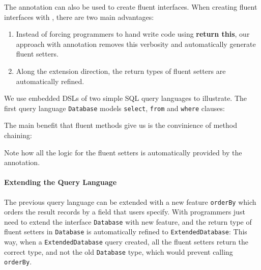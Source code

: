 The \mixin annotation can also be used to create fluent interfaces.  When
creating fluent interfaces with \mixin, there are two main advantages:
\begin{enumerate}
\item Instead of forcing programmers to hand write code using \textbf{return
    this}, our approach with \mixin annotation removes this verbosity and
  automatically generate fluent setters.
\item Along the extension direction, the return types of fluent setters are
  automatically refined.
\end{enumerate} 

\noindent We use embedded DSLs of two simple SQL query languages to illustrate.
The first query language \texttt{Database}  models
\texttt{select}, \texttt{from} and \texttt{where} clauses:

\noindent The main benefit that fluent methods give
us is the convinience of method chaining:


\noindent Note how all the logic for the fluent setters is automatically provided by the \mixin annotation. 

\paragraph{Extending the Query Language} The previous query language can be extended with a new feature
\texttt{orderBy} which orders the result records by a field that users
specify. With \mixin programmers just need to extend the interface \texttt{Database} with new
feature, and the return type of fluent setters in
\texttt{Database} is automatically refined to \texttt{ExtendedDatabase}:
This way, when a \texttt{ExtendedDatabase} query created, 
all the fluent setters return the correct type, and not the old \texttt{Database} type, which would prevent calling 
\texttt{orderBy}.


